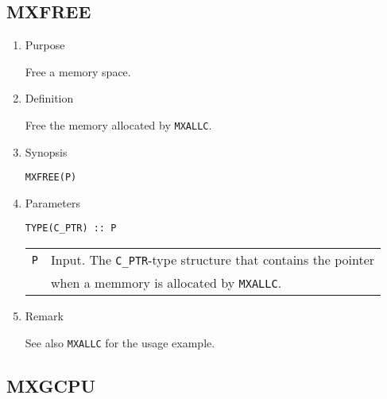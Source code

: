 \documentclass[a4paper]{scrartcl}
\begin{document}
\subsection{MXFREE}

\begin{enumerate}

\item Purpose 

Free a memory space.

\item Definition

Free the memory allocated by \texttt{MXALLC}.

\item Synopsis 
    
\texttt{MXFREE(P)}
  
\item Parameters

\begin{verbatim}
TYPE(C_PTR) :: P
\end{verbatim}
  
    
\begin{tabular}{ll}
\texttt{P} & Input. 
The \texttt{C\_PTR}-type structure that contains  the pointer\\
 & when a memmory is allocated by \texttt{MXALLC}.
\end{tabular}

\item Remark

See also \texttt{MXALLC} for the usage example.

\end{enumerate}


\subsection{MXGCPU}
\end{document}
